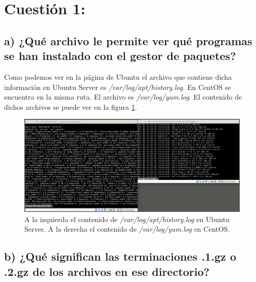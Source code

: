 \documentclass[a4paper,titlepage,12pt]{scrartcl}	%
\numberwithin{figure}{section} %
\numberwithin{table}{section} %
\begin{document}
	\tableofcontents
	\clearpage
	\listoffigures %
	\clearpage
	
	\section[Cuestión 1:]{Cuestión 1:}
	\subsection[a) ¿Qué archivo le permite ver qué programas se han	instalado con el gestor de paquetes?]{a) ¿Qué archivo le permite ver qué programas se han	instalado con el gestor de paquetes?}
	
	Como podemos ver en la página de Ubuntu \cite{apthistory} el archivo que contiene dicha información en Ubuntu Server es \textit{/var/log/apt/history.log}. En CentOS se encuentra en la misma ruta. El archivo es \textit{/var/log/yum.log}. El contenido de dichos archivos se puede ver en la figura \ref{1-install_log}.
	
	\begin{figure}[H]
		\includegraphics[width=\linewidth]{./Imagenes/1-install_log.png}
		\vspace{-0.5cm}
		\caption[A la izquierda el contenido de \textit{/var/log/apt/history.log} en Ubuntu Server. A la derecha el contenido de \textit{/var/log/yum.log} en CentOS.]{A la izquierda el contenido de \textit{/var/log/apt/history.log} en Ubuntu Server. A la derecha el contenido de \textit{/var/log/yum.log} en CentOS.}
		\label{1-install_log}
	\end{figure}
	
	\subsection[b) ¿Qué significan las terminaciones .1.gz o .2.gz de los archivos en ese directorio?]{b) ¿Qué significan las terminaciones .1.gz o .2.gz de los archivos en ese directorio?}
	
\end{document}
